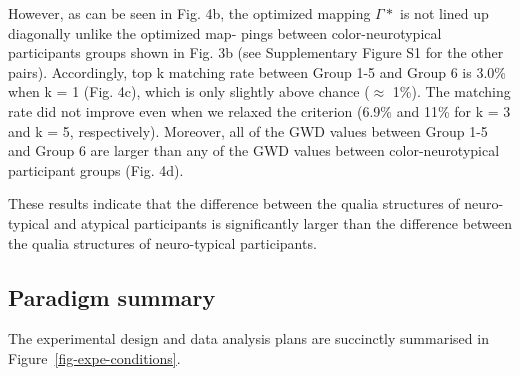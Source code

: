 \documentclass[
  authoryear]{elsarticle}
\begin{document}
However, as can be seen in Fig. 4b, the optimized mapping \(\Gamma*\) is
not lined up diagonally unlike the optimized map- pings between
color-neurotypical participants groups shown in Fig. 3b (see
Supplementary Figure S1 for the other pairs). Accordingly, top k
matching rate between Group 1-5 and Group 6 is 3.0\% when k = 1 (Fig.
4c), which is only slightly above chance (\(\approx\) 1\%). The matching
rate did not improve even when we relaxed the criterion (6.9\% and 11\%
for k = 3 and k = 5, respectively). Moreover, all of the GWD values
between Group 1-5 and Group 6 are larger than any of the GWD values
between color-neurotypical participant groups (Fig. 4d).

These results indicate that the difference between the qualia structures
of neuro-typical and atypical participants is significantly larger than
the difference between the qualia structures of neuro-typical
participants.

\subsection{Paradigm summary}\label{paradigm-summary}

The experimental design and data analysis plans are succinctly
summarised in Figure~\ref{fig-expe-conditions}.
\end{document}
